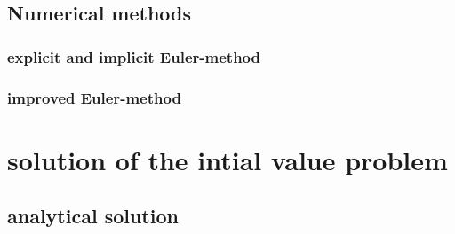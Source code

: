 \documentclass[
paper=A4,fontsize=12pt,
BCOR=15mm,DIV=22,
headinclude=true,footinclude=false,
parskip=full,
numbers=noendperiod,
ngerman,fleqn,             %
bibliography=totoc, %
toc=listof, %
cleardoublepage=empty,      %
version = last
]{scrartcl}
\begin{document}
\subsection{Numerical methods}

\subsubsection{explicit and implicit Euler-method}

\subsubsection{improved Euler-method}


\section{solution of the intial value problem}
\subsection{analytical solution}
\end{document}
